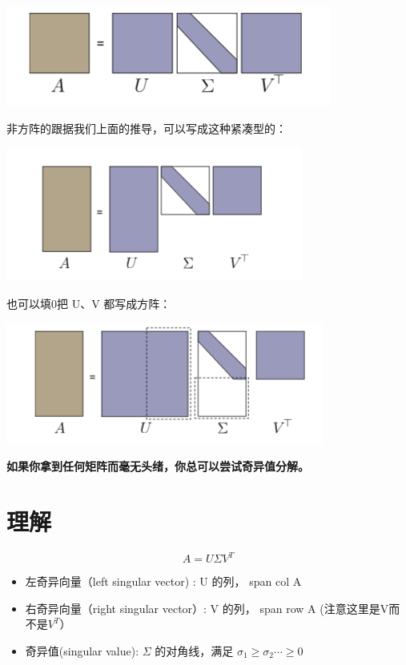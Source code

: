 \documentclass[
]{book}
\providecommand{\tightlist}{%
  \setlength{\itemsep}{0pt}\setlength{\parskip}{0pt}}
\begin{document}
\includegraphics{images/svd_01.png}

非方阵的跟据我们上面的推导，可以写成这种紧凑型的：

\includegraphics{images/svd_02.png}

也可以填0把 U、V 都写成方阵：

\includegraphics{images/svd_03.png}

\textbf{如果你拿到任何矩阵而毫无头绪，你总可以尝试奇异值分解。}

\hypertarget{ux7406ux89e3}{%
\section{理解}\label{ux7406ux89e3}}

\[A = U \Sigma V^T\]

\begin{itemize}
\tightlist
\item
  左奇异向量（left singular vector) : U 的列， span col A
\item
  右奇异向量（right singular vector）: V 的列， span row A (注意这里是V而不是\(V^T\)）
\item
  奇异值(singular value): \(\Sigma\) 的对角线，满足 \(\sigma_1 \ge \sigma_2 \cdots \ge 0\)
\end{itemize}
\end{document}
